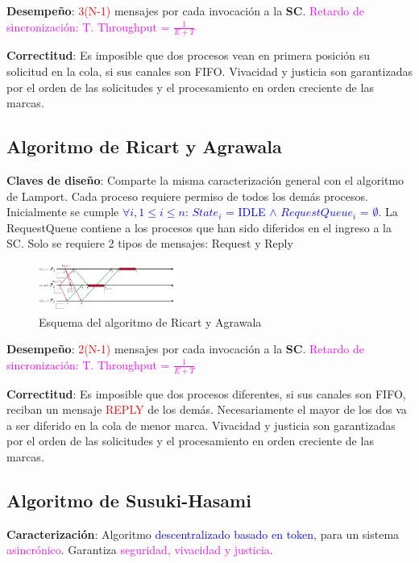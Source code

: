 \textbf{Desempeño}: \textcolor{red}{3(N-1)} mensajes por cada invocación a la \textbf{SC}. \textcolor{magenta}{Retardo de sincronización: T. Throughput = $\frac{1}{E+T}$}

\textbf{Correctitud}: Es imposible que dos procesos vean en primera posición su solicitud en la cola, si sus canales son FIFO. Vivacidad y justicia son garantizadas por el orden de las solicitudes y el procesamiento en orden creciente de las marcas.

\subsection{Algoritmo de Ricart y Agrawala}

\textbf{Claves de diseño}: Comparte la misma caracterización general con el algoritmo de Lamport. Cada proceso requiere permiso de todos los demás procesos. Inicialmente se cumple \textcolor{blue}{$\forall i, 1 \leq i \leq n$: $State_i$ = IDLE $\wedge$ $RequestQueue_i$ = $\emptyset$}. La RequestQueue contiene a los procesos que han sido diferidos en el ingreso a la SC. Solo se requiere 2 tipos de mensajes: Request y Reply


\begin{figure}[H]
    \centering
    \includegraphics[width=0.4\textwidth]{img/A_Ricart_Agrawala.png}
    \caption{Esquema del algoritmo de Ricart y Agrawala}
\end{figure}

\textbf{Desempeño}: \textcolor{red}{2(N-1)} mensajes por cada invocación a la \textbf{SC}.  \textcolor{magenta}{Retardo de sincronización: T. Throughput = $\frac{1}{E+T}$}

\textbf{Correctitud}: Es imposible que dos procesos diferentes, si sus canales son FIFO, reciban un mensaje \textcolor{red}{REPLY} de los demás. Necesariamente el mayor de los dos va a ser diferido en la cola de menor marca. Vivacidad y justicia son garantizadas por el orden de las solicitudes y el procesamiento en orden creciente de las marcas.

\subsection{Algoritmo de Susuki-Hasami}

\textbf{Caracterización}: Algoritmo \textcolor{blue}{descentralizado basado en token}, para un sistema \textcolor{magenta}{asincrónico}. Garantiza \textcolor{magenta}{seguridad, vivacidad y justicia}.

